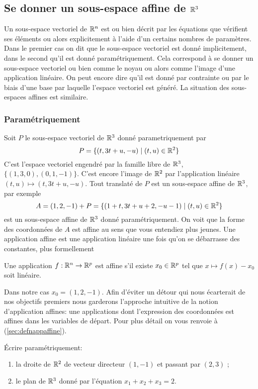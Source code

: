 \documentclass[11pt, a4paper]{article}
\begin{document}
\subsection{Se donner un sous-espace affine de $\mathbb{R}^3$}

Un sous-espace vectoriel de $\mathbb{R}^n$ est ou bien décrit par les
équations que vérifient ses éléments ou alors explicitement à l'aide
d'un certains nombres de paramètres. Dans le premier cas on dit que le
sous-espace vectoriel est donné implicitement, dans le second qu'il
est donné paramétriquement. Cela correspond à se donner un sous-espace
vectoriel ou bien comme le noyau ou alors comme l'image d'une
application linéaire. On peut encore dire qu'il est donné par
contrainte ou par le biais d'une base par laquelle l'espace vectoriel
est généré. La situation des sous-espaces affines est similaire.

\subsubsection{Paramétriquement}

Soit $P$ le sous-espace vectoriel de $\mathbb{R}^3$ donné parametriquement par
\[
P = \{(t, 3t+u, -u) \mid (t, u) \in \mathbb{R}^2\}
\]
C'est l'espace vectoriel engendré par la famille libre de $\mathbb{R}^3$,
$\{(1, 3, 0), (0, 1, -1)\}$.  C'est encore l'image de $\mathbb{R}^2$ par
l'application linéaire $(t, u) \mapsto (t, 3t+u, -u)$. Tout translaté
de $P$ est un sous-espace affine de $\mathbb{R}^3$, par exemple
\[
A = (1, 2, -1) + P = \{(1+t, 3t+u+2, -u-1)\mid (t, u) \in \mathbb{R}^2\}
\]
est un sous-espace affine de $\mathbb{R}^3$ donné paramétriquement. On voit
que la forme des coordonnées de $A$ est affine au sens que vous
entendiez plus jeunes. Une application affine est une application
linéaire une fois qu'on se débarrasse des constantes, plus
formellement
\begin{defn}
  Une application $f : \mathbb{R}^n \rightarrow \mathbb{R}^p$ est
  affine s'il existe $x_0 \in \mathbb{R}^p$ tel que
  $x \mapsto f(x) - x_0$ soit linéaire.
\end{defn}
Dans notre cas $x_0 = (1, 2, -1)$. Afin d'éviter un détour qui nous
écarterait de nos objectifs premiers nous garderons l'approche
intuitive de la notion d'application affines: une applications dont
l'expression des coordonnées est affines dans les variables de
départ. Pour plus détail on vous renvoie à (\ref{sec:defnappaffine}).
\begin{question}
  Écrire paramétriquement:
  \begin{enumerate}
  \item la droite de $\mathbb{R}^2$ de vecteur directeur $(1, -1)$ et passant
    par $(2, 3)$ ;
  \item le plan de $\mathbb{R}^3$ donné par l'équation $x_1 + x_2 + x_3 = 2$.
  \end{enumerate}
\end{question}
\end{document}
